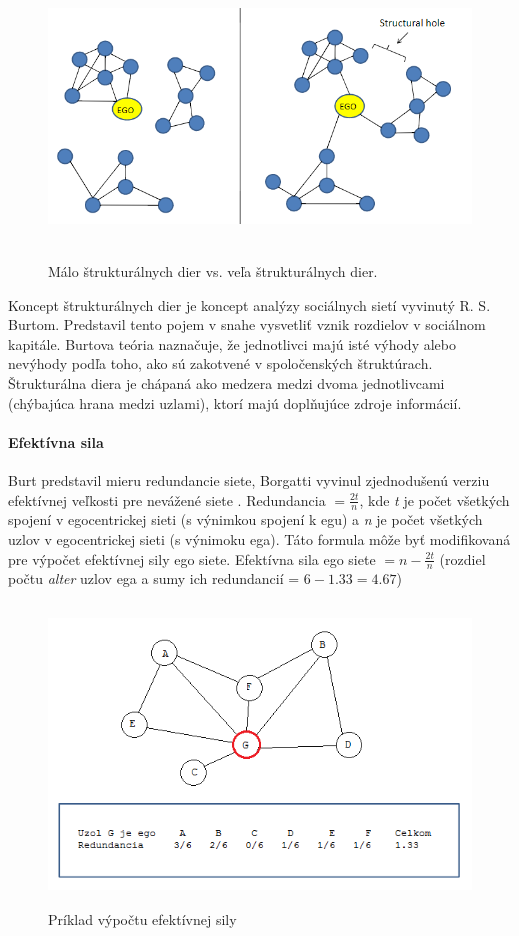 \documentclass[slovak,master,public,dept460,male,cpdeclaration,oneside]{diploma}
\begin{document}
\begin{figure}[H]
\centering
\includegraphics[width=15cm, height=7.5cm]{figures/structuralholes}
\caption{Málo štrukturálnych dier vs. veľa štrukturálnych dier.}
\end{figure}


Koncept štrukturálnych dier je koncept analýzy sociálnych sietí vyvinutý R. S. Burtom. Predstavil tento pojem v snahe vysvetliť vznik rozdielov v sociálnom kapitále. Burtova teória naznačuje, že jednotlivci majú isté výhody alebo nevýhody podľa toho, ako sú zakotvené v spoločenských štruktúrach. Štrukturálna diera je chápaná ako medzera medzi dvoma jednotlivcami (chýbajúca hrana medzi uzlami), ktorí majú doplňujúce zdroje informácií. \cite{burt2004structural}

\paragraph{Efektívna sila}
\hfill \break
Burt predstavil mieru redundancie siete, Borgatti vyvinul zjednodušenú verziu efektívnej veľkosti pre nevážené siete \cite{borgatti1997structural}. Redundancia ${ = \frac{2t}{n}}$, kde \textit{t} je počet všetkých spojení v egocentrickej sieti (s výnimkou spojení k egu) a \textit{n} je počet všetkých uzlov v egocentrickej sieti (s výnimoku ega). Táto formula môže byť modifikovaná pre výpočet efektívnej sily ego siete. Efektívna sila ego siete ${ = n - \frac{2t}{n}}$ (rozdiel počtu \textit{alter} uzlov ega a sumy ich redundancií = ${6-1.33 = 4.67}$)


\begin{figure}[H]
\centering
\includegraphics[width=14cm, height=8cm]{figures/efectivesize}
\caption{Príklad výpočtu efektívnej sily}
\end{figure}
\end{document}
